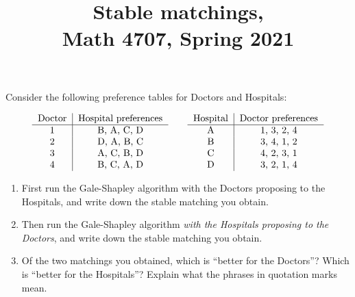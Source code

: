 \documentclass[11pt]{article}
\title{Stable matchings,  \\Math 4707, Spring 2021}
\date{}
\begin{document}
\maketitle

\thispagestyle{empty}

Consider the following preference tables for Doctors and Hospitals:

\[ \begin{tabular}{c | c }
Doctor & Hospital preferences \\ \hline
1 & B, A, C, D \\
2 & D, A, B, C \\
3 & A, C, B, D \\
4 & B, C, A, D
\end{tabular} \qquad \begin{tabular}{c | c }
Hospital & Doctor preferences \\ \hline
A & 1, 3, 2, 4 \\
B & 3, 4, 1, 2 \\
C & 4, 2, 3, 1 \\
D & 3, 2, 1, 4
\end{tabular} \]

\begin{enumerate}
\item First run the Gale-Shapley algorithm with the Doctors proposing to the Hospitals, and write down the stable matching you obtain.
\item Then run the Gale-Shapley algorithm \emph{with the Hospitals proposing to the Doctors}, and write down the stable matching you obtain.
\item Of the two matchings you obtained, which is ``better for the Doctors''? Which is ``better for the Hospitals''? Explain what the phrases in quotation marks mean.
\end{enumerate}
\end{document}
